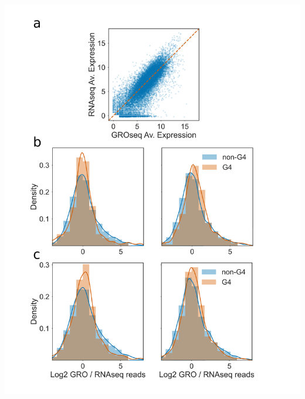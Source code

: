 \documentclass[12pt,a4paper,]{report}
\let\origfigure=\figure
\let\endorigfigure=\endfigure
\renewenvironment{figure}[1][2] {
    \expandafter\origfigure\expandafter[H]
} {
    \endorigfigure
}
\begin{document}
\newpage

\begin{figure}[htbp]
\centering
\includegraphics[width=\textwidth,height=562pt,keepaspectratio]{chapter_5/figures/gro_g4s.png}
\caption[Log Ratio of GRO / RNA seq counts per million detects abortive transcription of PG4 dense genes.]{\textbf{Log   Ratio   of   GRO   /   RNA   seq   counts   per   million   detects   abortive   transcription   of   PG4   dense   genes.}   \textbf{a)}   Scatter   plot   showing   measured   expression   in   log2   counts   per   million   (logCPM)   for   each   gene   from   GRO-seq   vs. RNAseq   datasets.   Genes   which   fall   below   and   to   the   right   of   the   orange   line   have   positive   log2   GRO/RNA   ratios.   \textbf{b)}   Histogram   and   kernel   density   estimates   of   GRO/RNA   ratio   for   genes   containing   PG4   predicted   by   G4Seeqer   (max   G4seeqer   score   >   0.9)   in   orange,   vs. genes   containing   no   G4s   (max   G4seeqer   score   <   0.1)   in   blue.   Left   and   right   panels   represent   coding   and   template   strand   G4   rich   genes,   respectively.   \textbf{c)}   Histogram   and   kernel   density   estimates   of   GRO/RNA   ratio   for   genes   containing   two   tetrad   maximal   PG4   density   per   200bp   of   3   or   greater   in   orange,   vs. genes   with   maximal   PG4   density   of   0   (contain   no   PG4s)   in   blue.   Left   and   right   panels   represent   coding   and   template   strand   G4   rich   genes,   respectively.   \label{gro}}

\end{figure}
\end{document}
